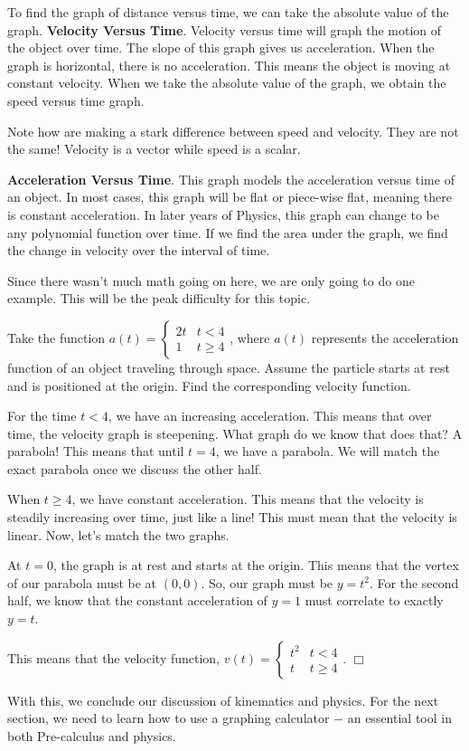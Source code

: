\documentclass[lang=en,11pt]{elegantbook}
\begin{document}
To find the graph of distance versus time, we can take the absolute value of the graph.
\textbf{Velocity Versus Time}.  Velocity versus time will graph the motion of the object over time.  The slope of this graph gives us acceleration.  When the graph is horizontal, there is no acceleration.  This means the object is moving at constant velocity.  When we take the absolute value of the graph, we obtain the speed versus time graph.

\begin{remark}
Note how are making a stark difference between speed and velocity.  They are not the same!  Velocity is a vector while speed is a scalar.
\end{remark}

\textbf{Acceleration Versus Time}.  This graph models the acceleration versus time of an object.  In most cases, this graph will be flat or piece-wise flat, meaning there is constant acceleration.  In later years of Physics, this graph can change to be any polynomial function over time.  If we find the area under the graph, we find the change in velocity over the interval of time.

Since there wasn't much math going on here, we are only going to do one example.  This will be the peak difficulty for this topic.
\begin{example}
Take the function $a(t)=\begin{cases} 2t & t<4 \\ 1 & t\geq 4 \end{cases}$, where $a(t)$ represents the acceleration function of an object traveling through space.  Assume the particle starts at rest and is positioned at the origin.  Find the corresponding velocity function.
\end{example}
\begin{solution}
For the time $t<4$, we have an increasing acceleration.  This means that over time, the velocity graph is steepening.  What graph do we know that does that? A parabola!  This means that until $t=4$, we have a parabola.  We will match the exact parabola once we discuss the other half.

When $t\geq 4$, we have constant acceleration.  This means that the velocity is steadily increasing over time, just like a line!  This must mean that the velocity is linear.  Now, let's match the two graphs.

At $t=0$, the graph is at rest and starts at the origin.  This means that the vertex of our parabola must be at $(0,0)$.  So, our graph must be $y=t^2$.  For the second half, we know that the constant acceleration of $y=1$ must correlate to exactly $y=t$.

This means that the velocity function, $v(t)=\begin{cases} t^2 & t<4 \\ t & t\geq 4\end{cases}$. $\Box$
\end{solution}
With this, we conclude our discussion of kinematics and physics.  For the next section, we need to learn how to use a graphing calculator $-$ an essential tool in both Pre-calculus and physics.
\end{document}
